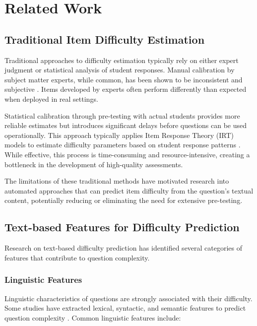\documentclass[
    a4paper, %
    10pt, %
    twoside, %
]{LTJournalArticle}
\begin{document}
\section{Related Work}

\subsection{Traditional Item Difficulty Estimation}

Traditional approaches to difficulty estimation typically rely on either expert judgment or statistical analysis of student responses. Manual calibration by subject matter experts, while common, has been shown to be inconsistent and subjective \cite{rudner2010implementing, impara1998teachers}. Items developed by experts often perform differently than expected when deployed in real settings.

Statistical calibration through pre-testing with actual students provides more reliable estimates but introduces significant delays before questions can be used operationally. This approach typically applies Item Response Theory (IRT) models to estimate difficulty parameters based on student response patterns \cite{rasch1960}. While effective, this process is time-consuming and resource-intensive, creating a bottleneck in the development of high-quality assessments.

The limitations of these traditional methods have motivated research into automated approaches that can predict item difficulty from the question's textual content, potentially reducing or eliminating the need for extensive pre-testing.

\subsection{Text-based Features for Difficulty Prediction}

Research on text-based difficulty prediction has identified several categories of features that contribute to question complexity.

\subsubsection{Linguistic Features}

Linguistic characteristics of questions are strongly associated with their difficulty. Some studies have extracted lexical, syntactic, and semantic features to predict question complexity \cite{alkhuzaey2023text, choi2020predicting}. Common linguistic features include:
\end{document}
